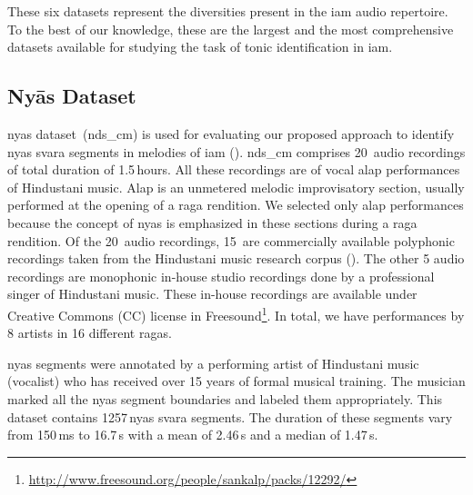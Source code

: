 {These six datasets represent the diversities present in the \gls{iam} audio repertoire. To the best of our knowledge, these are the largest and the most comprehensive datasets available for studying the task of tonic identification in \gls{iam}. 


\subsection{Ny\={a}s Dataset}
\label{sec:corpus_nyas_dataset}

\Gls{nyas} dataset~(\acrshort{nds_cm}) is used for evaluating our proposed approach to identify \gls{nyas} \gls{svara} segments in melodies of \gls{iam} (). \acrshort{nds_cm} comprises 20~audio recordings of total duration of 1.5\,hours. All these recordings are of vocal \gls{alap} performances of Hindustani music. \gls{Alap} is an unmetered melodic improvisatory section, usually performed at the opening of a \gls{raga} rendition. We selected only \gls{alap} performances because the concept of \gls{nyas} is emphasized in these sections during a \gls{raga} rendition. Of the 20~audio recordings, 15~are commercially available polyphonic recordings taken from the Hindustani music research corpus (). The other 5 audio recordings are monophonic in-house studio recordings done by a professional singer of Hindustani music. These in-house recordings are available under Creative Commons (CC) license in Freesound\footnote{\url{http://www.freesound.org/people/sankalp/packs/12292/}}. In total, we have performances by 8 artists in 16 different \glspl{raga}.%

\Gls{nyas} segments were annotated by a performing artist of Hindustani music (vocalist) who has received over 15 years of formal musical training. The musician marked all the \gls{nyas} segment boundaries and labeled them appropriately. This dataset contains 1257\,\gls{nyas} \gls{svara} segments. The duration of these segments vary from 150\,ms to 16.7\,s with a mean of 2.46\,s and a median of 1.47\,s.



}
